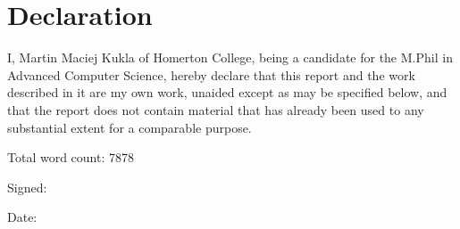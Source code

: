 \section*{Declaration}

\noindent I, Martin Maciej Kukla of Homerton College, being a candidate for the M.Phil in Advanced Computer Science, hereby declare that this report and the work described in it are my own work, unaided except as may be specified below, and that the report does not contain material that has already been used to any substantial extent for a comparable purpose.

\vspace{20pt}

\noindent Total word count: 7878

\vspace{20pt}

\noindent Signed:

\vspace{20pt}

\noindent Date:
